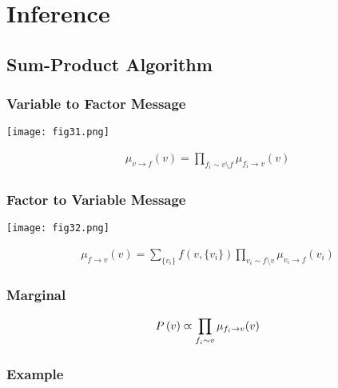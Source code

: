 \section{Inference}
\label{section12.5}

\subsection{Sum-Product Algorithm}

\subsubsection*{Variable to Factor Message}

\begin{minipage}{0.4\textwidth}
	\centering
	\texttt{[image: fig31.png]}
\end{minipage}
\begin{minipage}{0.6\textwidth}
	\begin{align*}
		\mu_{v\to f}(v)=\prod_{f_i\sim v\setminus f}\mu_{f_i\to v}(v)
	\end{align*}
\end{minipage}

\subsubsection*{Factor to Variable Message}

\begin{minipage}{0.4\textwidth}
	\centering
	\texttt{[image: fig32.png]}
\end{minipage}
\begin{minipage}{0.6\textwidth}
	\begin{align*}
		\mu_{f\to v}(v)=\sum_{\{v_i\}}f(v,\{v_i\})\prod_{v_i\sim f\setminus v}\mu_{v_i\to f}(v_i)
	\end{align*}
\end{minipage}

\subsubsection*{Marginal}

\begin{align*}
	P\left(v\right)\varpropto\prod_{f_i\sim v}\mu_{f_i\to v}(v)
\end{align*}

\subsubsection*{Example}

